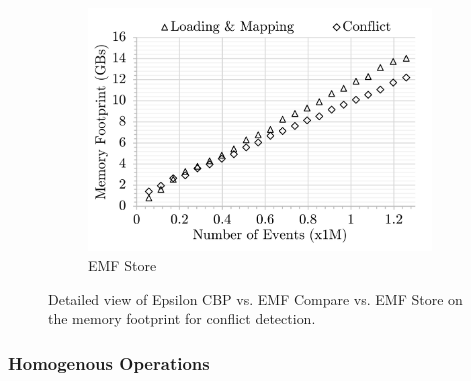\begin{figure}[ht]
\begin{subfigure}[t]{0.32\linewidth}
        \includegraphics[width=\linewidth]{emfs-conflict-memory-events}
        \caption{EMF Store}
        \label{fig:emfs-conflict-memory-events}
    \end{subfigure}
    \caption{Detailed view of Epsilon CBP vs. EMF Compare vs. EMF Store on the memory footprint for conflict detection.}
    \label{fig:conflict_memory_events}
\end{figure}

\subsubsection{Homogenous Operations}
\label{sec:homogenous-operation_conflict}

